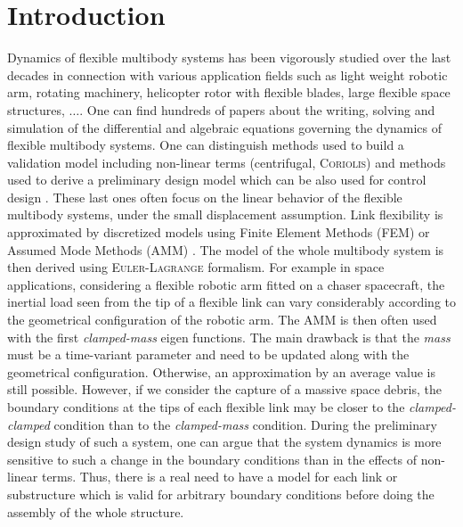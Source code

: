 \section{Introduction}
\label{intro} 
Dynamics of flexible multibody systems has been vigorously studied over the last decades in connection with various application fields such as light weight robotic arm, rotating machinery, helicopter rotor with flexible blades, large flexible space structures, $\dots$. One can find hundreds of papers about the writing, solving and simulation of the differential and algebraic equations governing the dynamics of flexible multibody systems\cite{Schiehlen97,ShabanaMSD1997}. One can distinguish methods used to build a validation model including non-linear terms (centrifugal, \textsc{Coriolis}) \cite{MohanSahaMSD2007,DeLucaSiciliano} and methods used to derive a preliminary design model which can be also used for control design \cite{Krauss2010,Murali2015}. These last ones often focus on the linear behavior of the flexible multibody systems, under the small displacement assumption. Link flexibility is approximated by discretized models using Finite Element Methods (FEM) or Assumed Mode Methods (AMM) \cite{TheodoreG95}. The model of the whole multibody system is then derived using \textsc{Euler-Lagrange} formalism.  For example in space applications, considering a flexible robotic arm fitted on a chaser spacecraft, the inertial load seen from the tip of a flexible link can vary considerably according to the geometrical configuration of the robotic arm. The AMM is then often used \cite{DeLucaSiciliano,TheodoreG95} with the first \textit{clamped-mass} eigen functions. The main drawback is that the \textit{mass} must be a time-variant parameter and need to be updated along with the geometrical configuration. Otherwise, an approximation by an average value is still possible. However, if we consider the capture of a massive space debris, the boundary conditions at the tips of each flexible link may be closer to the \textit{clamped-clamped} condition than to the \textit{clamped-mass} condition. During the preliminary design study of such a system, one can argue that the system dynamics is more sensitive to such a change in the boundary conditions than in the effects of non-linear terms.  Thus, there is a real need to have a model for each link or substructure which is valid for arbitrary boundary conditions before doing the assembly of the whole structure.

